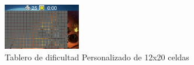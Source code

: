 \documentclass[11pt]{article} %
\begin{document}
\begin{center}

	\begin{figure}[h!]
  		\centering
    		\includegraphics[width=0.3\textwidth]{imagenes/tableroPersonalizado.PNG}
  		\caption{Tablero de dificultad Personalizado de 12x20 celdas}
		\label{fig:tableropersonalizado}
	\end{figure}
\end{center} 
\end{document}
